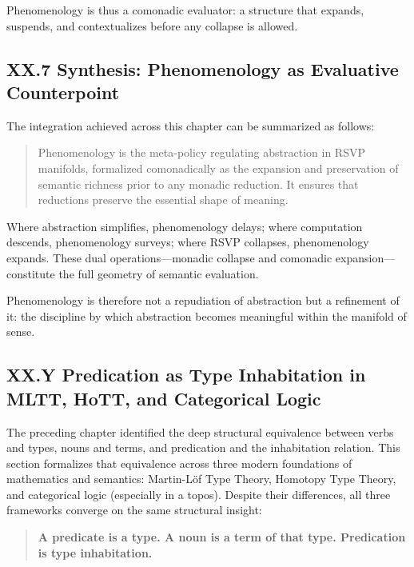 \documentclass[12pt,letterpaper]{article}
\begin{document}
Phenomenology is thus a comonadic evaluator: a structure that expands,
suspends, and contextualizes before any collapse is allowed.

\subsection{XX.7 Synthesis: Phenomenology as Evaluative Counterpoint}

The integration achieved across this chapter can be summarized as follows:
\begin{quote}
Phenomenology is the meta-policy regulating abstraction in RSVP manifolds,
formalized comonadically as the expansion and preservation of semantic
richness prior to any monadic reduction.  It ensures that reductions preserve
the essential shape of meaning.
\end{quote}

Where abstraction simplifies, phenomenology delays; where computation descends,
phenomenology surveys; where RSVP collapses, phenomenology expands.  These dual
operations---monadic collapse and comonadic expansion---constitute the full
geometry of semantic evaluation.

Phenomenology is therefore not a repudiation of abstraction but a refinement of
it: the discipline by which abstraction becomes meaningful within the manifold
of sense.

\subsection{XX.Y Predication as Type Inhabitation in MLTT, HoTT, and Categorical Logic}

The preceding chapter identified the deep structural equivalence between verbs
and types, nouns and terms, and predication and the inhabitation relation.  This
section formalizes that equivalence across three modern foundations of
mathematics and semantics: Martin-Löf Type Theory, Homotopy Type Theory, and
categorical logic (especially in a topos).  Despite their differences, all three
frameworks converge on the same structural insight:

\begin{quote}
\textbf{A predicate is a type.  
A noun is a term of that type.  
Predication is type inhabitation.}
\end{quote}
\end{document}
